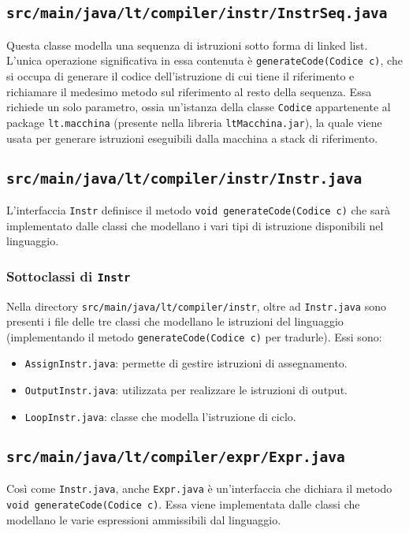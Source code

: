 \documentclass[10pt,a4paper]{article}
\begin{document}
\subsection{\texttt{src/main/java/lt/compiler/instr/InstrSeq.java}}
Questa classe modella una sequenza di istruzioni sotto forma di linked list.
L'unica operazione significativa in essa contenuta è \texttt{generateCode(Codice c)}, che si occupa di generare il codice dell'istruzione di cui tiene il riferimento e richiamare il medesimo metodo sul riferimento al resto della sequenza.
Essa richiede un solo parametro, ossia un'istanza della classe \texttt{Codice} appartenente al package \texttt{lt.macchina} (presente nella libreria \texttt{ltMacchina.jar}), la quale viene usata per generare istruzioni eseguibili dalla macchina a stack di riferimento.

\subsection{\texttt{src/main/java/lt/compiler/instr/Instr.java}}
L'interfaccia \texttt{Instr} definisce il metodo \texttt{void generateCode(Codice c)} che sarà implementato dalle classi che modellano i vari tipi di istruzione disponibili nel linguaggio.

\subsubsection{Sottoclassi di \texttt{Instr}}
Nella directory \texttt{src/main/java/lt/compiler/instr}, oltre ad \texttt{Instr.java} sono presenti i file delle tre classi che modellano le istruzioni del linguaggio (implementando il metodo \texttt{generateCode(Codice c)} per tradurle).
Essi sono:
\begin{itemize}
    \item \texttt{AssignInstr.java}: permette di gestire istruzioni di assegnamento.
    \item \texttt{OutputInstr.java}: utilizzata per realizzare le istruzioni di output.
    \item \texttt{LoopInstr.java}: classe che modella l'istruzione di ciclo.
\end{itemize}

\subsection{\texttt{src/main/java/lt/compiler/expr/Expr.java}}
Così come \texttt{Instr.java}, anche \texttt{Expr.java} è un'interfaccia che dichiara il metodo \texttt{void generateCode(Codice c)}.
Essa viene implementata dalle classi che modellano le varie espressioni ammissibili dal linguaggio.
\end{document}
